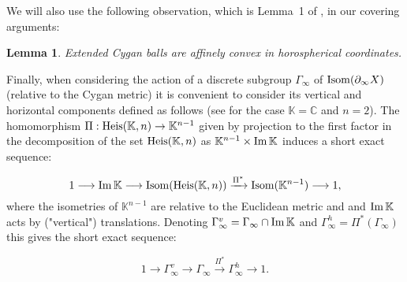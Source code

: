 \documentclass{article}[12pt]
\newcommand{\C}{\mathbb{C}}
\newcommand{\K}{\mathbb{K}}
\newtheorem{cor}{Corollary}
\newtheorem{lem}{Lemma}%
\newcommand{\Pf}{{\em Proof}. }
\newcommand{\EPf}{\hfill$\Box$\vspace{.5cm}}
\begin{document}

  
We will also use the following observation, which is Lemma~1 of \cite{FFP}, in our covering arguments:

\begin{lem}\label{cyganconvex} Extended Cygan balls are affinely convex in horospherical coordinates.
\end{lem}  

Finally, when considering the action of a discrete subgroup $\Gamma_\infty$ of ${\rm Isom}(\partial_\infty X)$ (relative to the Cygan metric) it is convenient to consider its vertical and horizontal components defined as follows (see \cite{FP} for the case $\K=\C$ and $n=2$). The homomorphism $\Pi:{\rm Heis}(\K,n) \rightarrow \K^{n-1}$ given by projection to the first factor in the decomposition of the set ${\rm Heis}(\K,n)$ as $\K^{n-1} \times {\rm Im} \, \K$ induces a short exact sequence:

\begin{equation}
1 \longrightarrow {\rm Im} \, \K \longrightarrow {\rm Isom}({\rm Heis}(\K,n)) \xrightarrow{\Pi ^*} {\rm Isom}(\K^{n-1}) \longrightarrow 1 ,
\end{equation}  
where the isometries of $\K^{n-1}$ are relative to the Euclidean metric and and ${\rm Im} \, \K$ acts by ("vertical") translations. Denoting $\Gamma_\infty^v=\Gamma_\infty \cap {\rm Im} \, \K$ and $\Gamma_\infty^h=\Pi ^*(\Gamma_\infty)$ this gives the short exact sequence:

\begin{equation}\label{exact}
1 \longrightarrow \Gamma_\infty^v \longrightarrow \Gamma_\infty \xrightarrow{\Pi ^*} \Gamma_\infty^h \longrightarrow 1 .
\end{equation}
\end{document}
